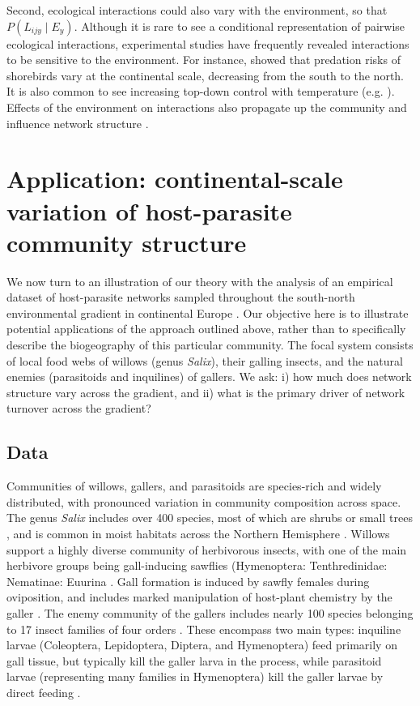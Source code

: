 \documentclass[12pt]{article}
\begin{document}
Second, ecological interactions could also vary with the environment, so that
$P(L_{ijy}\mid E_y)$. Although it is rare to see a conditional representation of
pairwise ecological interactions, experimental studies have frequently
revealed interactions to be sensitive to the environment. For instance,
\citet{Mckinnon2010} showed that predation risks of shorebirds vary at the
continental scale, decreasing from the south to the north. It is also common
to see increasing top-down control with temperature (e.g. \citealt{Shurin2012,
Gray2016}). Effects of the environment on interactions \citep{Gibert2014} also
propagate up the community and influence network structure
\citep{Tylianakis2007, Woodward2010, Petchey2010a}.


\section*{Application: continental-scale variation of host-parasite community structure}

We now turn to an illustration of our theory with the analysis of an empirical
dataset of host-parasite networks sampled throughout the south-north
environmental gradient in continental Europe \citep{Kopelke2017}. Our
objective here is to illustrate potential applications of the approach
outlined above, rather than to specifically describe the biogeography
of this particular community. The focal system consists of local food webs of
willows (genus \textit{Salix}), their galling insects, and the natural enemies
(parasitoids and inquilines) of gallers. We ask:
i) how much does network structure vary across the gradient, and ii) what is
the primary driver of network turnover across the gradient?

\subsection*{Data}

Communities of willows, gallers, and parasitoids are species-rich and widely
distributed, with pronounced variation in community composition across space.
The genus \textit{Salix} includes over 400 species, most of which are shrubs
or small trees \citep{Argus1997}, and is common in moist habitats across the
Northern Hemisphere \citep{Skvortsov1999}. Willows support a highly diverse
community of herbivorous insects, with one of the main herbivore groups being
gall-inducing sawflies (Hymenoptera: Tenthredinidae: Nematinae: Euurina
\citep{Kopelke1999}. Gall formation is induced by sawfly females during
oviposition, and includes marked manipulation of host-plant chemistry by the
galler \citep{Nyman2000}. The enemy community of the gallers includes nearly
100 species belonging to 17 insect families of four orders
\citep{Kopelke2003}. These encompass two main types: inquiline larvae
(Coleoptera, Lepidoptera, Diptera, and Hymenoptera) feed primarily on gall
tissue, but typically kill the galler larva in the process, while parasitoid
larvae (representing many families in Hymenoptera) kill the galler larvae by
direct feeding \citep{Kopelke2003}.
\end{document}
